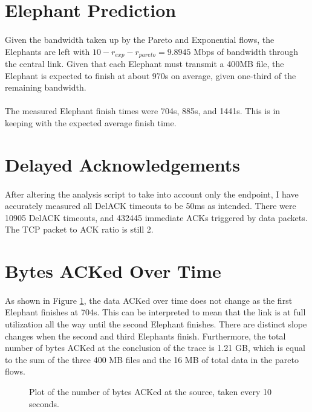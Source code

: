 \documentclass{article}
\begin{document}
\section{Elephant Prediction}

\paragraph{}
Given the bandwidth taken up by the Pareto and Exponential flows, the Elephants are left with $10 - r_{exp} - r_{pareto} = 9.8945$ Mbps of bandwidth through the central link.
Given that each Elephant must transmit a 400MB file, the Elephant is expected to finish at about 970s on average, given one-third of the remaining bandwidth.

\paragraph{}
The measured Elephant finish times were 704s, 885s, and 1441s. This is in keeping with the expected average finish time.

\section{Delayed Acknowledgements}
\paragraph{}
After altering the analysis script to take into account only the endpoint, I have accurately measured all DelACK timeouts to be 50ms as intended.
There were 10905 DelACK timeouts, and 432445 immediate ACKs triggered by data packets.
The TCP packet to ACK ratio is still 2.

\section{Bytes ACKed Over Time}
\paragraph{}
As shown in Figure \ref{fig:ack_plot}, the data ACKed over time does not change as the first Elephant finishes at 704s.
This can be interpreted to mean that the link is at full utilization all the way until the second Elephant finishes.
There are distinct slope changes when the second and third Elephants finish.
Furthermore, the total number of bytes ACKed at the conclusion of the trace is 1.21 GB, which is equal to the sum of the three 400 MB files and the 16 MB of total data in the pareto flows.

\begin{figure}[h]
  \begin{centering}
    
    \caption{Plot of the number of bytes ACKed at the source, taken every 10 seconds.}
    \label{fig:ack_plot}
  \end{centering}
\end{figure}
\end{document}
